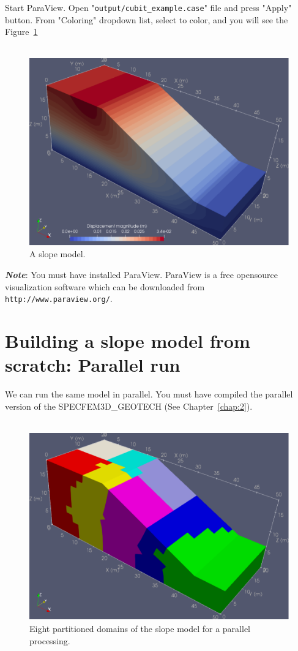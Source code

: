 Start ParaView. Open "\texttt{output/cubit\_example.case}" file and press "Apply" button. From "Coloring" dropdown list, select  to color, and you will see the Figure~\ref{fig:disp}\\
\\
\begin{figure}[ht]
\centering
\includegraphics[scale=0.7]{cubit_example_disp}
\caption{A slope model.}
\label{fig:disp}
\end{figure}

\textbf{\emph{Note}}: You must have installed ParaView. ParaView is a free opensource visualization software which
can be downloaded from \texttt{http://www.paraview.org/}.

\section{Building a slope model from scratch: Parallel run}
\label{sec:cubit}

We can run the same model in parallel. You must have compiled the parallel version of the SPECFEM3D\_GEOTECH (See Chapter~\ref{chap:2}).\\
\\
\begin{figure}[ht]
\centering
\includegraphics[scale=0.7]{cubit_example_parallel}
\caption{Eight partitioned domains of the slope model for a parallel processing.}
\label{fig:par}
\end{figure}

